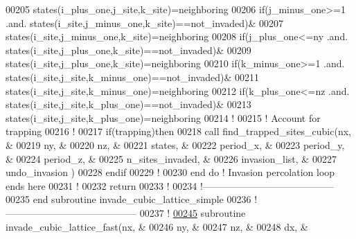 \begin{DoxyCode}
00205             states(i\_plus\_one,j\_site,k\_site)=neighboring
00206        \textcolor{keyword}{if}(j\_minus\_one>=1 .and. states(i\_site,j\_minus\_one,k\_site)==not\_invaded)&
00207             states(i\_site,j\_minus\_one,k\_site)=neighboring
00208        \textcolor{keyword}{if}(j\_plus\_one<=ny .and. states(i\_site,j\_plus\_one,k\_site)==not\_invaded)&
00209             states(i\_site,j\_plus\_one,k\_site)=neighboring
00210        \textcolor{keyword}{if}(k\_minus\_one>=1 .and. states(i\_site,j\_site,k\_minus\_one)==not\_invaded)&
00211             states(i\_site,j\_site,k\_minus\_one)=neighboring
00212        \textcolor{keyword}{if}(k\_plus\_one<=nz .and. states(i\_site,j\_site,k\_plus\_one)==not\_invaded)&
00213             states(i\_site,j\_site,k\_plus\_one)=neighboring 
00214        \textcolor{comment}{!}
00215        \textcolor{comment}{! Account for trapping }
00216        \textcolor{comment}{!}
00217        \textcolor{keyword}{if}(trapping)\textcolor{keyword}{then}
00218           call find\_trapped\_sites\_cubic(nx,                &
00219                                         ny,                &
00220                                         nz,                &
00221                                         states,            &
00222                                         period\_x,          &
00223                                         period\_y,          &
00224                                         period\_z,          &
00225                                         n\_sites\_invaded,   &
00226                                         invasion\_list,     &
00227                                         undo\_invasion      )
00228        \textcolor{keyword}{endif}
00229        \textcolor{comment}{!}
00230     \textcolor{keyword}{end do} \textcolor{comment}{! Invasion percolation loop ends here}
00231     \textcolor{comment}{!}
00232     return
00233     \textcolor{comment}{!}
00234   \textcolor{comment}{!-----------------------------------------}
00235 \textcolor{keyword}{  end subroutine invade\_cubic\_lattice\_simple}
00236   \textcolor{comment}{!-----------------------------------------}
00237   \textcolor{comment}{!}
\hypertarget{module__invasion__percolation_8f90_source_l00245}{}\hyperlink{classmodule__invasion__percolation_a9e829564e60b49318517ba5e944da4d8}{00245}   \textcolor{keyword}{subroutine }invade\_cubic\_lattice\_fast(nx,              &
00246                                        ny,              &
00247                                        nz,              &
00248                                        dx,              &

\end{DoxyCode}
